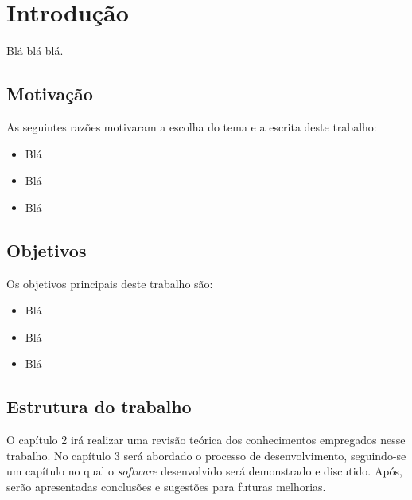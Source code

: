 \chapter{Introdução}

Blá blá blá.

\section{Motivação}
As seguintes razões motivaram a escolha do tema e a escrita deste trabalho:
\begin{itemize}
\item Blá
\item Blá
\item Blá
\end{itemize}

\section{Objetivos}

Os objetivos principais deste trabalho são:

\begin{itemize}
\item Blá
\item Blá
\item Blá 
\end{itemize}


\section{Estrutura do trabalho}

O capítulo 2 irá realizar uma revisão teórica dos conhecimentos empregados nesse trabalho. No capítulo 3 será abordado o processo de desenvolvimento, seguindo-se um capítulo no qual o \textit{software} desenvolvido será demonstrado e discutido. Após, serão apresentadas conclusões e sugestões para futuras melhorias.
